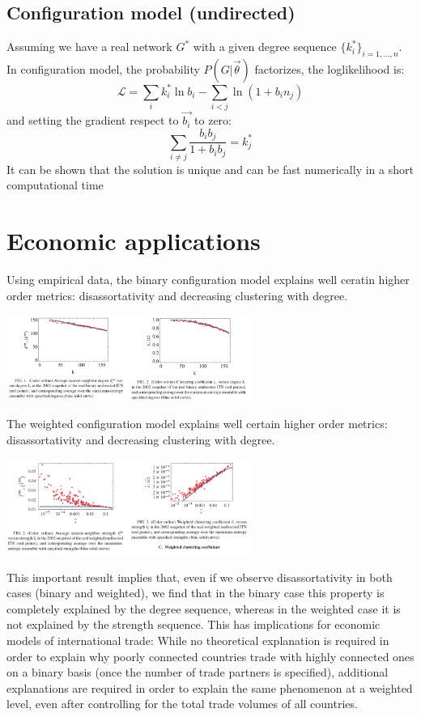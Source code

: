 \subsection{Configuration model (undirected)}
Assuming we have a real network $G^\ast$ with a given degree sequence $\{k^\ast_i\}_{i =1,\ldots,n}$. In configuration model, the probability $P(G|\vec{\theta})$ factorizes, the loglikelihood is:
\[
\mathcal{L} = \sum_i k_i^\ast \ln b_i - \sum_{i<j} \ln (1 + b_in_j)
\]
and setting the gradient respect to $\vec{b_i}$ to zero:
\[
\sum_{i\neq j} \frac{b_ib_j}{1 + b_ib_j} = k_j^\ast
\]
It can be shown that the solution is unique and can be fast numerically in a short computational time
\section{Economic applications}
Using empirical data, the binary configuration model explains well ceratin higher order metrics: disassortativity and decreasing clustering with degree.
\begin{center}
	\includegraphics[width=0.6\textwidth]{picture/(44)world_trade_network_1.png}
\end{center}
The weighted configuration model explains well certain higher order metrics: disassortativity and decreasing clustering with degree.
\begin{center}
	\includegraphics[width=0.6\textwidth]{picture/(45)world_trade_network_2.png}
\end{center}
\begin{myquote}
This important result implies that, even if we observe disassortativity in both cases (binary and weighted), we find that in the binary case this property is completely explained by the degree sequence, whereas in the weighted case it is not explained by the strength sequence. This has implications for economic models of international trade: While no theoretical explanation is required in order to explain why poorly connected countries trade with highly connected ones on a binary basis (once the number of trade partners is specified), additional explanations are required in order to explain the same phenomenon at a weighted level, even after controlling for the total trade volumes of all
countries.
\end{myquote}
